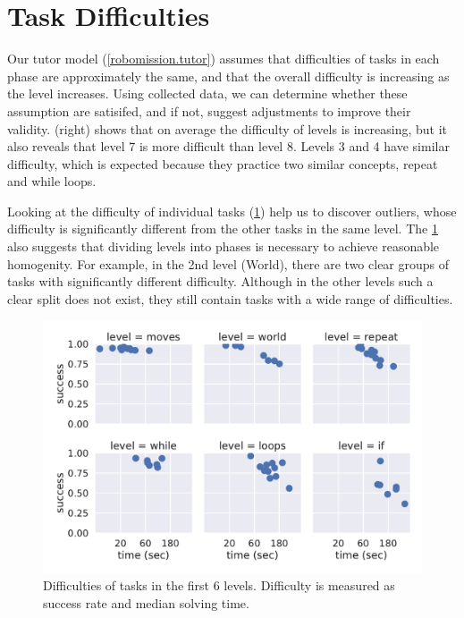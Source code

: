 \section{Task Difficulties}


Our tutor model (\cref{robomission.tutor}) assumes that difficulties of tasks
in each phase are approximately the same,
and that the overall difficulty is increasing as the level increases.   %
Using collected data, we can determine whether these assumption are satisifed,
and if not, suggest adjustments to improve their validity.
 (right) shows that on average the difficulty of levels
is increasing, but it also reveals that level 7 is more difficult than level 8.
Levels 3 and 4 have similar difficulty, which is expected because they practice
two similar concepts, repeat and while loops.

Looking at the difficulty of individual tasks (\cref{fig:difficulties-tasks-levels})
help us to discover outliers, whose difficulty is significantly
different from the other tasks in the same level.
The \cref{fig:difficulties-tasks-levels} also suggests that dividing levels
into phases is necessary to achieve reasonable homogenity. For example, in the 2nd
level (World), there are two clear groups of tasks with significantly different
difficulty. Although in the other levels such a clear split does not exist,
they still contain tasks with a wide range of difficulties. %

\begin{figure}[htb]
\centering
\includegraphics[width=\textwidth]{img/difficulties-tasks-levels}
\caption{%
  Difficulties of tasks in the first 6 levels.
  Difficulty is measured as success rate and median solving time.}
\label{fig:difficulties-tasks-levels}
\end{figure}

